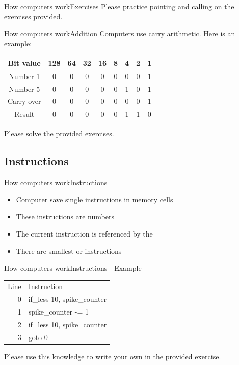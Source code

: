 \documentclass[aspectratio=169]{beamer}
\begin{document}
\begin{frame}{How computers work}{Exercises}
Please practice pointing and calling on the exercises provided.
\end{frame}

\begin{frame}{How computers work}{Addition}
Computers use carry arithmetic.
Here is an example:
\vspace{2em}

\begin{tabular}{ccccccccc}
Bit value  & 128 & 64 & 32 & 16 & 8 & 4 & 2 & 1 \\
\midrule
Number 1   & 0   &  0 &  0 &  0 & 0 & 0 & 0 & 1 \\
Number 5   & 0   &  0 &  0 &  0 & 0 & 1 & 0 & 1 \\
Carry over & 0   &  0 &  0 &  0 & 0 & 0 & 0 & 1 \\
\midrule
Result     & 0   &  0 &  0 &  0 & 0 & 1 & 1 & 0 \\
\end{tabular}

\pause

Please solve the provided exercises.

\end{frame}

\subsection{Instructions}
\begin{frame}{How computers work}{Instructions}
\begin{itemize}
	\item Computer save single instructions in memory cells
	\item These instructions are numbers
	\item The current instruction is referenced by the 
	\item There are smallest or  instructions
\end{itemize}
\end{frame}

\begin{frame}{How computers work}{Instructions - Example}
\begin{tabular}{rl}
	Line & Instruction \\
	0    & if\_less 10, spike\_counter \\
	1    & \phantom{tab1} spike\_counter -= 1 \\
	2    & if\_less 10, spike\_counter \\
	3    & \phantom{tab1} goto 0 \\
\end{tabular}

\vspace{2em}

Please use this knowledge to write your own  in the provided exercise.

\end{frame}
\end{document}
